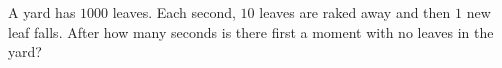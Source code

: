 A yard has $1000$ leaves. Each second, $10$ leaves are raked away and then $1$ new leaf falls. After how many seconds is there first a moment with no leaves in the yard?
